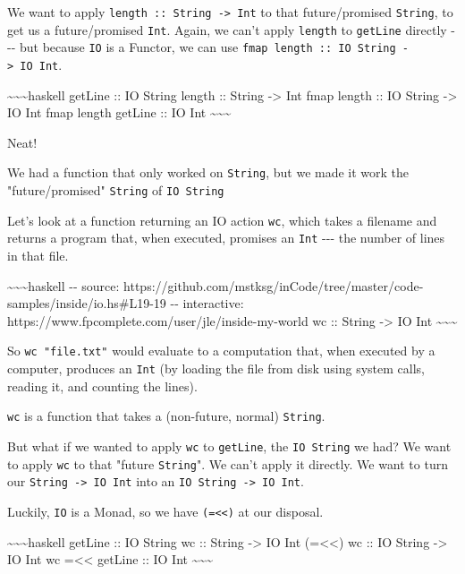 \documentclass[]{article}
\begin{document}
We want to apply \texttt{length\ ::\ String\ -\textgreater{}\ Int} to that
future/promised \texttt{String}, to get us a future/promised \texttt{Int}.
Again, we can't apply \texttt{length} to \texttt{getLine} directly -\/-\/- but
because \texttt{IO} is a Functor, we can use
\texttt{fmap\ length\ ::\ IO\ String\ -\textgreater{}\ IO\ Int}.

\textasciitilde{}\textasciitilde{}\textasciitilde{}haskell getLine :: IO String
length :: String -\textgreater{} Int fmap length :: IO String -\textgreater{} IO
Int fmap length getLine :: IO Int
\textasciitilde{}\textasciitilde{}\textasciitilde{}

Neat!

We had a function that only worked on \texttt{String}, but we made it work the
"future/promised" \texttt{String} of \texttt{IO\ String}

Let's look at a function returning an IO action \texttt{wc}, which takes a
filename and returns a program that, when executed, promises an \texttt{Int}
-\/-\/- the number of lines in that file.

\textasciitilde{}\textasciitilde{}\textasciitilde{}haskell -\/- source:
https://github.com/mstksg/inCode/tree/master/code-samples/inside/io.hs\#L19-19
-\/- interactive: https://www.fpcomplete.com/user/jle/inside-my-world wc ::
String -\textgreater{} IO Int
\textasciitilde{}\textasciitilde{}\textasciitilde{}

So \texttt{wc\ "file.txt"} would evaluate to a computation that, when executed
by a computer, produces an \texttt{Int} (by loading the file from disk using
system calls, reading it, and counting the lines).

\texttt{wc} is a function that takes a (non-future, normal) \texttt{String}.

But what if we wanted to apply \texttt{wc} to \texttt{getLine}, the
\texttt{IO\ String} we had? We want to apply \texttt{wc} to that "future
\texttt{String}". We can't apply it directly. We want to turn our
\texttt{String\ -\textgreater{}\ IO\ Int} into an
\texttt{IO\ String\ -\textgreater{}\ IO\ Int}.

Luckily, \texttt{IO} is a Monad, so we have \texttt{(=\textless{}\textless{})}
at our disposal.

\textasciitilde{}\textasciitilde{}\textasciitilde{}haskell getLine :: IO String
wc :: String -\textgreater{} IO Int (=\textless{}\textless{}) wc :: IO String
-\textgreater{} IO Int wc =\textless{}\textless{} getLine :: IO Int
\textasciitilde{}\textasciitilde{}\textasciitilde{}
\end{document}
